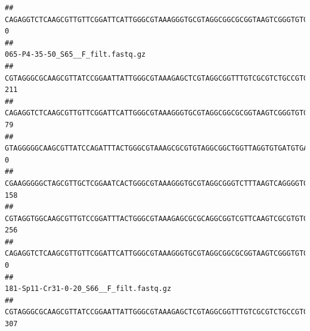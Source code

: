 \documentclass[]{article}
\begin{document}
\begin{verbatim}
## CAGAGGTCTCAAGCGTTGTTCGGATTCATTGGGCGTAAAGGGTGCGTAGGCGGCGCGGTAAGTCGGGTGTGAAATCTCGGGGCTTAACTCCGAAACTGCATTCGATACTGCCGTGCTTGAGGACTGGAGAGGAGACTGGAATTTACGGTGTAGCGGTGAAATGCGTAGATATCGTAAGGAAGACCAGTGGCGAAGGCGGGTCTCTGGACAGTTCCTGACGCTGAGGCACGAAGGCCAGGGGAGCAAACG                                 0
##                                                                                                                                                                                                                                                           065-P4-35-50_S65__F_filt.fastq.gz
## CGTAGGGCGCAAGCGTTATCCGGAATTATTGGGCGTAAAGAGCTCGTAGGCGGTTTGTCGCGTCTGCCGTGAAAGTCCGGGGCTCAACTCCGGATCTGCGGTGGGTACGGGCAGACTAGAGTGATGTAGGGGAGACTGGAATTCCTGGTGTAGCGGTGAAATGCGCAGATATCAGGAGGAACACCGATGGCGAAGGCAGGTCTCTGGGCATTAACTGACGCTGAGGAGCGAAAGCATGGGGAGCGAACA                               211
## CAGAGGTCTCAAGCGTTGTTCGGATTCATTGGGCGTAAAGGGTGCGTAGGCGGCGCGGTAAGTCGGGTGTGAAATCTCGGAGCTTAACTCCGAAACTGCATTCGATACTGCCGTGCTTGAGGACTGGAGAGGAGACTGGAATTTACGGTGTAGCGGTGAAATGCGTAGATATCGTAAGGAAGACCAGTGGCGAAGGCGGGTCTCTGGACAGTTCCTGACGCTGAGGCACGAAGGCCAGGGGAGCAAACG                                79
## GTAGGGGGCAAGCGTTATCCAGATTTACTGGGCGTAAAGCGCGTGTAGGCGGCTGGTTAGGTGTGATGTGAAATCTTCCGGCTCAACCGGAAAACTGCATTGCAAACCGGCCTGGCTAGAGTGCAGGAGAGGGAAGCGGAATTCCAGGTGTAGCGGTGAAATGCGTAGATATCTGGAGGAACACCAGTGGCGAAGGCGGCTTCCTGGCCTGCAACTGACGCTGAGACGCGAAAGCGTGGGGAGCGAAC                                  0
## CGAAGGGGGCTAGCGTTGCTCGGAATCACTGGGCGTAAAGGGTGCGTAGGCGGGTCTTTAAGTCAGGGGTGAAATCCTGGAGCTCAACTCCAGAACTGCCTTTGATACTGAAGATCTTGAGTTCGGGAGAGGTGAGTGGAACTGCGAGTGTAGAGGTGAAATTCGTAGATATTCGCAAGAACACCAGTGGCGAAGGCGGCTCACTGGCCCGATACTGACGCTGAGGCACGAAAGCGTGGGGAGCAAACA                               158
## CGTAGGTGGCAAGCGTTGTCCGGATTTACTGGGCGTAAAGAGCGCGCAGGCGGTCGTTCAAGTCGCGTGTGAAAGCCCCCGGCTCAACTGGGGAGGGTCACGCGATACTGATCGACTCGAAGGCAGGAGAGGGTAGTGGAATTCCCGGTGTAGTGGTGAAATGCGTAGATATCGGGAGGAACACCAGTGGCGAAGGCGACTACCTGGCCTGTTCTTGACGCTGAGGCGCGAAAGCTAGGGGAGCAAACG                               256
## CAGAGGTCTCAAGCGTTGTTCGGATTCATTGGGCGTAAAGGGTGCGTAGGCGGCGCGGTAAGTCGGGTGTGAAATCTCGGGGCTTAACTCCGAAACTGCATTCGATACTGCCGTGCTTGAGGACTGGAGAGGAGACTGGAATTTACGGTGTAGCGGTGAAATGCGTAGATATCGTAAGGAAGACCAGTGGCGAAGGCGGGTCTCTGGACAGTTCCTGACGCTGAGGCACGAAGGCCAGGGGAGCAAACG                                 0
##                                                                                                                                                                                                                                                           181-Sp11-Cr31-0-20_S66__F_filt.fastq.gz
## CGTAGGGCGCAAGCGTTATCCGGAATTATTGGGCGTAAAGAGCTCGTAGGCGGTTTGTCGCGTCTGCCGTGAAAGTCCGGGGCTCAACTCCGGATCTGCGGTGGGTACGGGCAGACTAGAGTGATGTAGGGGAGACTGGAATTCCTGGTGTAGCGGTGAAATGCGCAGATATCAGGAGGAACACCGATGGCGAAGGCAGGTCTCTGGGCATTAACTGACGCTGAGGAGCGAAAGCATGGGGAGCGAACA                                     307

\end{verbatim}
\end{document}
